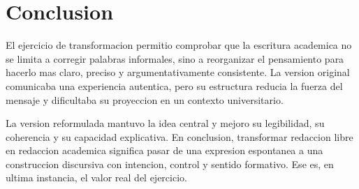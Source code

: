 \documentclass[
	spanish,
	letterpaper, oneside
]{article}
\begin{document}
%

\section{Conclusion}

El ejercicio de transformacion permitio comprobar que la escritura academica no se limita a corregir palabras informales, sino a reorganizar el pensamiento para hacerlo mas claro, preciso y argumentativamente consistente. La version original comunicaba una experiencia autentica, pero su estructura reducia la fuerza del mensaje y dificultaba su proyeccion en un contexto universitario.

La version reformulada mantuvo la idea central y mejoro su legibilidad, su coherencia y su capacidad explicativa. En conclusion, transformar redaccion libre en redaccion academica significa pasar de una expresion espontanea a una construccion discursiva con intencion, control y sentido formativo. Ese es, en ultima instancia, el valor real del ejercicio.

% 



\end{document}
